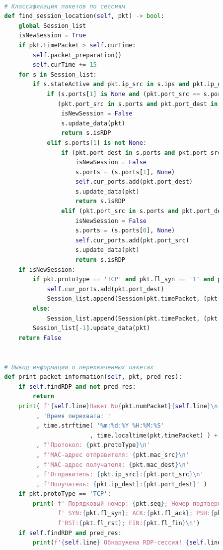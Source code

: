 \documentclass[bachelor, och, coursework]{SCWorks}
\begin{document}
\begin{lstlisting}[language=Python]
      
          # Классификация пакетов по сессиям
          def find_session_location(self, pkt) -> bool:
              global Session_list
              isNewSession = True
              if pkt.timePacket > self.curTime:
                  self.packet_preparation()
                  self.curTime += 15
              for s in Session_list:
                  if s.stateActive and pkt.ip_src in s.ips and pkt.ip_dest in s.ips:
                      if (s.ports[1] is None and (pkt.port_src == s.ports[0] or pkt.port_dest == s.ports[0])) or \
                         (pkt.port_src in s.ports and pkt.port_dest in s.ports):
                          isNewSession = False
                          s.update_data(pkt)
                          return s.isRDP
                      elif s.ports[1] is not None:
                          if (pkt.port_dest in s.ports and pkt.port_src not in s.ports):
                              isNewSession = False
                              s.ports = (s.ports[1], None)
                              self.cur_ports.add(pkt.port_dest)
                              s.update_data(pkt)
                              return s.isRDP
                          elif (pkt.port_src in s.ports and pkt.port_dest not in s.ports):
                              isNewSession = False
                              s.ports = (s.ports[0], None)
                              self.cur_ports.add(pkt.port_src)
                              s.update_data(pkt)
                              return s.isRDP
              if isNewSession:
                  if pkt.protoType == 'TCP' and pkt.fl_syn == '1' and pkt.fl_ack == '0':
                      self.cur_ports.add(pkt.port_dest)
                      Session_list.append(Session(pkt.timePacket, (pkt.ip_src, pkt.ip_dest), (pkt.port_dest, None)))
                  else:
                      Session_list.append(Session(pkt.timePacket, (pkt.ip_src, pkt.ip_dest), (pkt.port_src, pkt.port_dest)))
                  Session_list[-1].update_data(pkt)
              return False
      
      
          # Вывод информации о перехваченных пакетах
          def print_packet_information(self, pkt, pred_res):
              if self.findRDP and not pred_res:
                  return
              print( f'{self.line}Пакет No{pkt.numPacket}{self.line}\n'
                   , 'Время перехвата: '
                   , time.strftime( '%m:%d:%Y %H:%M:%S'
                                  , time.localtime(pkt.timePacket) ) + '\n'
                   , f'Протокол: {pkt.protoType}\n'
                   , f'MAC-адрес отправителя: {pkt.mac_src}\n'
                   , f'MAC-адрес получателя: {pkt.mac_dest}\n'
                   , f'Отправитель: {pkt.ip_src}:{pkt.port_src}\n'
                   , f'Получатель: {pkt.ip_dest}:{pkt.port_dest}' )
              if pkt.protoType == 'TCP':
                  print( f' Порядковый номер: {pkt.seq}; Номер подтверждения: {pkt.ack}\n' +
                         f' SYN:{pkt.fl_syn}; ACK:{pkt.fl_ack}; PSH:{pkt.fl_psh}; ' +
                         f'RST:{pkt.fl_rst}; FIN:{pkt.fl_fin}\n')
              if self.findRDP and pred_res:
                  print(f'{self.line} Обнаружена RDP-сессия! {self.line}')
      

\end{lstlisting}
\end{document}
